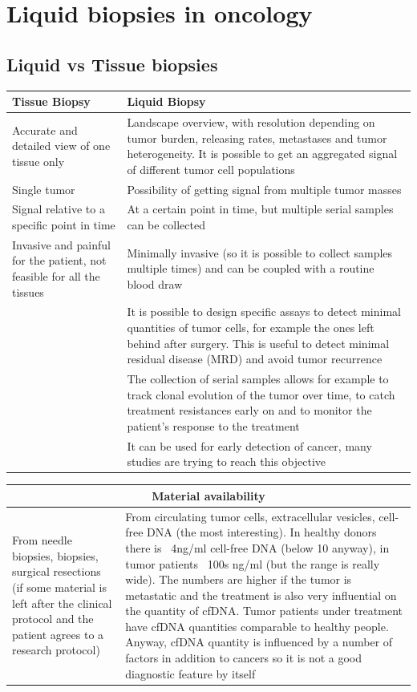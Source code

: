 \graphicspath{{chapters/LiquidBiopsiesImages/}}

\chapter{Liquid biopsies in oncology}

\section{Liquid vs Tissue biopsies}

\begin{tabular}{ | m{5cm}| m{9cm} | }
 \hline
 \textbf{Tissue Biopsy} & \textbf{Liquid Biopsy} \\
 \hline
 Accurate and detailed view of one tissue only & Landscape overview, with resolution depending on tumor burden, releasing rates, metastases and tumor heterogeneity. It is possible to get an aggregated signal of different tumor cell populations \\
 \hline
 Single tumor & Possibility of getting signal from multiple tumor masses \\
 \hline
 Signal relative to a specific point in time & At a certain point in time, but multiple serial samples can be collected \\
 \hline
 Invasive and painful for the patient, not feasible for all the tissues & Minimally invasive (so it is possible to collect samples multiple times) and can be coupled with a routine blood draw \\
 \hline
 & It is possible to design specific assays to detect minimal quantities of tumor cells, for example the ones left behind after surgery. This is useful to detect minimal residual disease (MRD) and avoid tumor recurrence \\
 \hline
 & The collection of serial samples allows for example to track clonal evolution of the tumor over time, to catch treatment resistances early on and to monitor the patient's response to the treatment \\
 \hline
 & It can be used for early detection of cancer, many studies are trying to reach this objective \\
 \hline
\end{tabular}

\begin{tabular}{ | m{7cm}| m{7cm} | }
 \hline
 \multicolumn{2}{|c|}{Material availability} \\
 \hline
 From needle biopsies, biopsies, surgical resections (if some material is left after the clinical protocol and the patient agrees to a research protocol) & From circulating tumor cells, extracellular vesicles, cell-free DNA (the most interesting). In healthy donors there is ~4ng/ml cell-free DNA (below 10 anyway), in tumor patients ~100s ng/ml (but the range is really wide). The numbers are higher if the tumor is metastatic and the treatment is also very influential on the quantity of cfDNA. Tumor patients under treatment have cfDNA quantities comparable to healthy people. Anyway, cfDNA quantity is influenced by a number of factors in addition to cancers so it is not a good diagnostic feature by itself \\
 \hline
\end{tabular}

